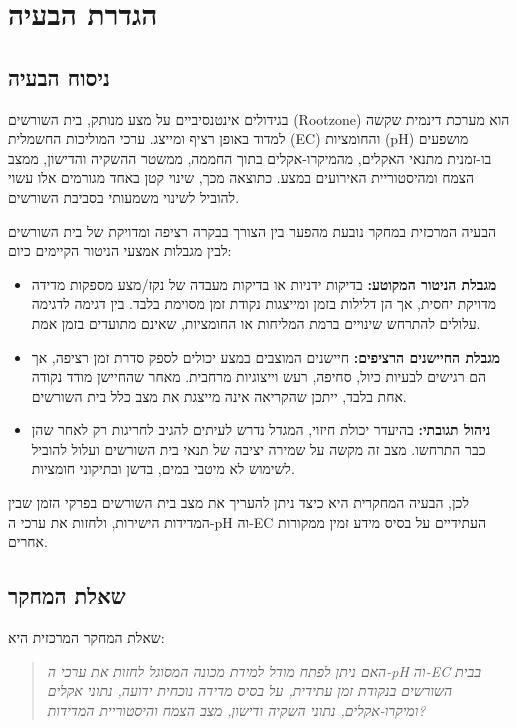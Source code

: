 \section{הגדרת הבעיה}

\subsection{ניסוח הבעיה}
בגידולים אינטנסיביים על מצע מנותק, בית השורשים (Rootzone) הוא מערכת דינמית שקשה למדוד באופן רציף ומייצג. ערכי המוליכות החשמלית (EC) והחומציות (pH) מושפעים בו-זמנית מתנאי האקלים, מהמיקרו-אקלים בתוך החממה, ממשטר ההשקיה והדישון, ממצב הצמח ומהיסטוריית האירועים במצע. כתוצאה מכך, שינוי קטן באחד מגורמים אלו עשוי להוביל לשינוי משמעותי בסביבת השורשים.

הבעיה המרכזית במחקר נובעת מהפער בין הצורך בבקרה רציפה ומדויקת של בית השורשים לבין מגבלות אמצעי הניטור הקיימים כיום:

\begin{itemize}
    \item \textbf{מגבלת הניטור המקוטע:} בדיקות ידניות או בדיקות מעבדה של נקז/מצע מספקות מדידה מדויקת יחסית, אך הן דלילות בזמן ומייצגות נקודת זמן מסוימת בלבד. בין דגימה לדגימה עלולים להתרחש שינויים ברמת המליחות או החומציות, שאינם מתועדים בזמן אמת.
    \item \textbf{מגבלת החיישנים הרציפים:} חיישנים המוצבים במצע יכולים לספק סדרת זמן רציפה, אך הם רגישים לבעיות כיול, סחיפה, רעש וייצוגיות מרחבית. מאחר שהחיישן מודד נקודה אחת בלבד, ייתכן שהקריאה אינה מייצגת את מצב כלל בית השורשים.
    \item \textbf{ניהול תגובתי:} בהיעדר יכולת חיזוי, המגדל נדרש לעיתים להגיב לחריגות רק לאחר שהן כבר התרחשו. מצב זה מקשה על שמירה יציבה של תנאי בית השורשים ועלול להוביל לשימוש לא מיטבי במים, בדשן ובתיקוני חומציות.
\end{itemize}

לכן, הבעיה המחקרית היא כיצד ניתן להעריך את מצב בית השורשים בפרקי הזמן שבין המדידות הישירות, ולחזות את ערכי ה-pH וה-EC העתידיים על בסיס מידע זמין ממקורות אחרים.

\subsection{שאלת המחקר}
שאלת המחקר המרכזית היא:

\begin{quote}
\itshape
האם ניתן לפתח מודל למידת מכונה המסוגל לחזות את ערכי ה-pH וה-EC בבית השורשים בנקודת זמן עתידית, על בסיס מדידה נוכחית ידועה, נתוני אקלים ומיקרו-אקלים, נתוני השקיה ודישון, מצב הצמח והיסטוריית המדידות?
\end{quote}

